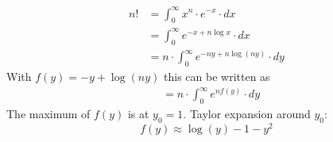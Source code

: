 \begin{align}
    n!
    &=\int_0^\infty x^n\cdot e^{-x}\cdot dx \\
    &=\int_0^\infty e^{-x+n\log x}\cdot dx \\
    &=n\cdot\int_0^\infty e^{-ny+n\log(ny)}\cdot dy
\end{align}
With $f(y)=-y+\log(ny)$ this can be written as
\begin{align}
    &=n\cdot\int_0^\infty e^{nf(y)}\cdot dy
\end{align}
The maximum of $f(y)$ is at $y_0=1$. Taylor expansion 
around $y_0$:
\begin{equation}
    f(y)\approx\log(y)-1-y^2
\end{equation}
